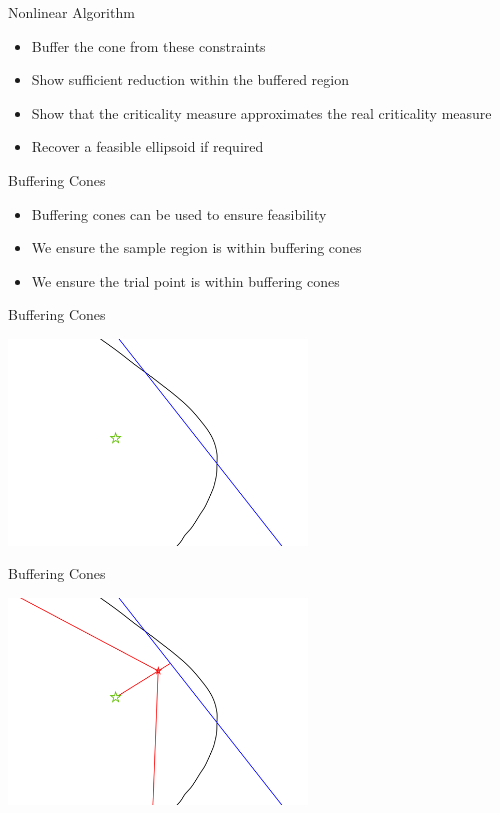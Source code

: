 \documentclass{beamer}
\begin{document}
\begin{frame}{Nonlinear Algorithm}
	\begin{itemize}
		\item Buffer the cone from these constraints
		\item Show sufficient reduction within the buffered region
		\item Show that the criticality measure approximates the real criticality measure
		\item Recover a feasible ellipsoid if required
	\end{itemize}
\end{frame}

\begin{frame}{Buffering Cones}
	\begin{itemize}
		\item Buffering cones can be used to ensure feasibility
		\item We ensure the sample region is within buffering cones
		\item We ensure the trial point is within buffering cones
	\end{itemize}
\end{frame}

\begin{frame}{Buffering Cones}
	\begin{center}
		\includegraphics[width=300px]{images/explanation_1.png}
	\end{center}
\end{frame}


\begin{frame}{Buffering Cones}
	\begin{center}
		\includegraphics[width=300px]{images/explanation_2.png}
	\end{center}
\end{frame}
\end{document}
